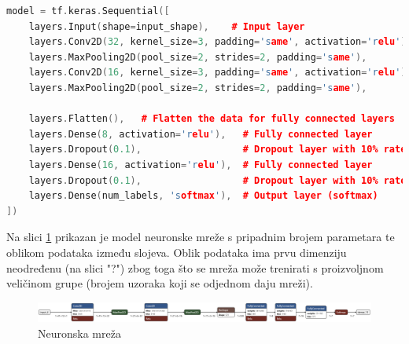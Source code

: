 \begin{lstlisting}[language=C++, caption=Struktura mreže, label=code:network]
model = tf.keras.Sequential([
    layers.Input(shape=input_shape),    # Input layer
    layers.Conv2D(32, kernel_size=3, padding='same', activation='relu'),
    layers.MaxPooling2D(pool_size=2, strides=2, padding='same'),
    layers.Conv2D(16, kernel_size=3, padding='same', activation='relu'),
    layers.MaxPooling2D(pool_size=2, strides=2, padding='same'),

    layers.Flatten(),   # Flatten the data for fully connected layers
    layers.Dense(8, activation='relu'),   # Fully connected layer
    layers.Dropout(0.1),                  # Dropout layer with 10% rate
    layers.Dense(16, activation='relu'),  # Fully connected layer
    layers.Dropout(0.1),                  # Dropout layer with 10% rate
    layers.Dense(num_labels, 'softmax'),  # Output layer (softmax)
])
\end{lstlisting}

Na slici \ref{pic:struktura} prikazan je model neuronske mreže s pripadnim brojem
parametara te oblikom podataka između slojeva. Oblik podataka ima prvu dimenziju 
neodređenu (na slici "?") zbog toga što se mreža može trenirati s proizvoljnom 
veličinom grupe (brojem uzoraka koji se odjednom daju mreži).

\begin{figure}[htb]
    \centering
    \includegraphics[width=1\linewidth]{Chapters/neuronska_mreza/struktura/model.png} 
    \caption{Neuronska mreža \cite{netron}}
    \label{pic:struktura}
\end{figure}

